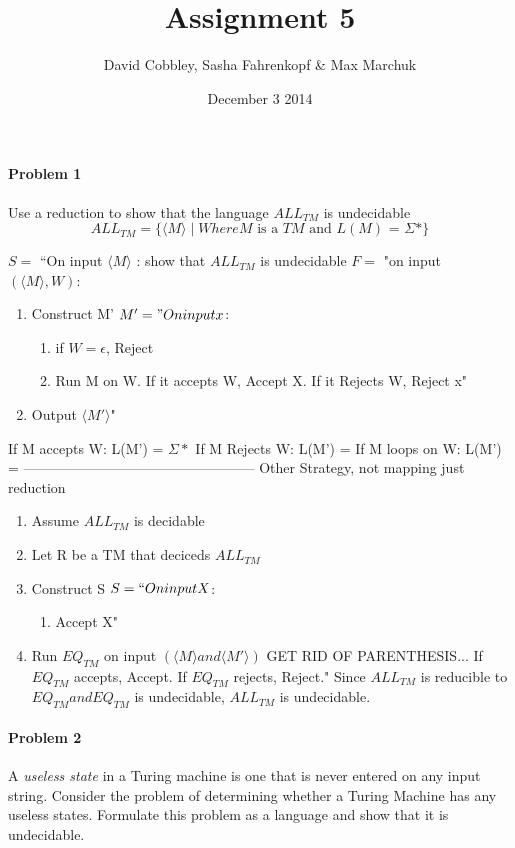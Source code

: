 \documentclass{article}
\title{Assignment 5}
\author{David Cobbley, Sasha Fahrenkopf \& Max Marchuk}
\date{December 3 2014}
\begin{document}
\maketitle


\paragraph{Problem 1} Use a reduction to show that the language $ALL_{TM}$ is undecidable
\[ALL_{TM} = \{ \langle M \rangle \;|\; Where M \mbox{ is a $TM$ and $L(M)$ = $\Sigma$*}\} \]


$S =$ ``On input $\langle M \rangle$ :
show that $ALL_{TM}$ is undecidable
$F =$ "on input $(\langle M \rangle , W)$:
\begin{enumerate}
\item Construct M'
$M' = "On input x$:
\begin{enumerate}
\item if $ W = \epsilon$, Reject
\item Run M on W.
 If it accepts W, Accept X.
 If it Rejects W, Reject x"
\end{enumerate}
\item Output $\langle M' \rangle$"
\end{enumerate}

If M accepts W:  L(M') = $\Sigma*$
If M Rejects W:  L(M') = \empty
If M loops on W: L(M') = \empty
--------------------------------------------------
Other Strategy, not mapping just reduction
\begin{enumerate}
\item Assume $ALL_{TM}$ is decidable
\item Let R be a TM that deciceds $ALL_{TM}$
\item Construct S
 $S = ``On input X$:
\begin{enumerate}
\item Accept X"
\end{enumerate}
\item Run $EQ_{TM}$ on input $(\langle M \rangle and \langle M' \rangle)$ GET RID OF PARENTHESIS...
 If $EQ_{TM}$ accepts, Accept. 
 If $EQ_{TM}$ rejects, Reject."
Since $ALL_{TM}$ is reducible to $EQ_{TM} and EQ_{TM}$ is undecidable, $ALL_{TM}$ is undecidable.
\end{enumerate}


\paragraph{Problem 2} A \textit{useless state} in a Turing machine is one that is never entered on any input string. Consider the problem of determining whether a Turing Machine has any useless states. Formulate this problem as a language and show that it is undecidable.
\end{document}
